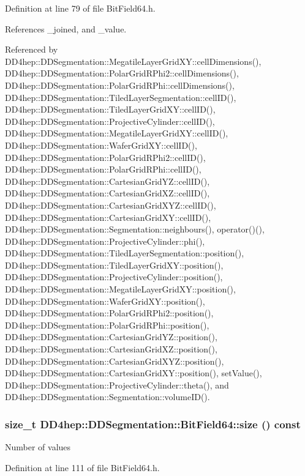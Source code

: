 Definition at line 79 of file BitField64.h.

References \_\-joined, and \_\-value.

Referenced by DD4hep::DDSegmentation::MegatileLayerGridXY::cellDimensions(), DD4hep::DDSegmentation::PolarGridRPhi2::cellDimensions(), DD4hep::DDSegmentation::PolarGridRPhi::cellDimensions(), DD4hep::DDSegmentation::TiledLayerSegmentation::cellID(), DD4hep::DDSegmentation::TiledLayerGridXY::cellID(), DD4hep::DDSegmentation::ProjectiveCylinder::cellID(), DD4hep::DDSegmentation::MegatileLayerGridXY::cellID(), DD4hep::DDSegmentation::WaferGridXY::cellID(), DD4hep::DDSegmentation::PolarGridRPhi2::cellID(), DD4hep::DDSegmentation::PolarGridRPhi::cellID(), DD4hep::DDSegmentation::CartesianGridYZ::cellID(), DD4hep::DDSegmentation::CartesianGridXZ::cellID(), DD4hep::DDSegmentation::CartesianGridXYZ::cellID(), DD4hep::DDSegmentation::CartesianGridXY::cellID(), DD4hep::DDSegmentation::Segmentation::neighbours(), operator()(), DD4hep::DDSegmentation::ProjectiveCylinder::phi(), DD4hep::DDSegmentation::TiledLayerSegmentation::position(), DD4hep::DDSegmentation::TiledLayerGridXY::position(), DD4hep::DDSegmentation::ProjectiveCylinder::position(), DD4hep::DDSegmentation::MegatileLayerGridXY::position(), DD4hep::DDSegmentation::WaferGridXY::position(), DD4hep::DDSegmentation::PolarGridRPhi2::position(), DD4hep::DDSegmentation::PolarGridRPhi::position(), DD4hep::DDSegmentation::CartesianGridYZ::position(), DD4hep::DDSegmentation::CartesianGridXZ::position(), DD4hep::DDSegmentation::CartesianGridXYZ::position(), DD4hep::DDSegmentation::CartesianGridXY::position(), setValue(), DD4hep::DDSegmentation::ProjectiveCylinder::theta(), and DD4hep::DDSegmentation::Segmentation::volumeID().\hypertarget{class_d_d4hep_1_1_d_d_segmentation_1_1_bit_field64_aff3b68ab610a6667f4240ddba2f4b728}{
\subsubsection[{size}]{\setlength{\rightskip}{0pt plus 5cm}size\_\-t DD4hep::DDSegmentation::BitField64::size () const}}
\label{class_d_d4hep_1_1_d_d_segmentation_1_1_bit_field64_aff3b68ab610a6667f4240ddba2f4b728}
Number of values 

Definition at line 111 of file BitField64.h.

